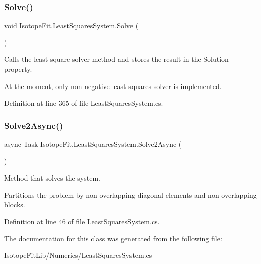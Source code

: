 \subsubsection{\texorpdfstring{Solve()}{Solve()}}
{\footnotesize\ttfamily void Isotope\+Fit.\+Least\+Squares\+System.\+Solve (\begin{DoxyParamCaption}{ }\end{DoxyParamCaption})}



Calls the least square solver method and stores the result in the Solution property. 

At the moment, only non-\/negative least squares solver is implemented. 

Definition at line 365 of file Least\+Squares\+System.\+cs.

\mbox{\label{class_isotope_fit_1_1_least_squares_system_ad831a418d7e7601dc7a64f5f7143534f}} 
\subsubsection{\texorpdfstring{Solve2\+Async()}{Solve2Async()}}
{\footnotesize\ttfamily async Task Isotope\+Fit.\+Least\+Squares\+System.\+Solve2\+Async (\begin{DoxyParamCaption}{ }\end{DoxyParamCaption})}



Method that solves the system. 

Partitions the problem by non-\/overlapping diagonal elements and non-\/overlapping blocks. 

Definition at line 46 of file Least\+Squares\+System.\+cs.



The documentation for this class was generated from the following file\+:\begin{DoxyCompactItemize}
\item 
Isotope\+Fit\+Lib/\+Numerics/Least\+Squares\+System.\+cs\end{DoxyCompactItemize}
